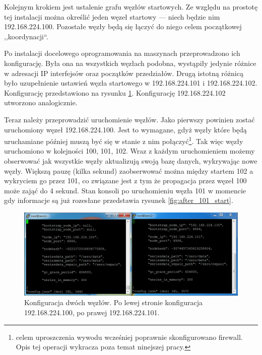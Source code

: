 \documentclass[a4paper,polish,12pt,twoside]{article}
\begin{document}
Kolejnym krokiem jest ustalenie grafu węzłów startowych. Ze względu na prostotę tej instalacji można określić jeden węzeł startowy --- niech będzie nim 192.168.224.100. Pozostałe węzły będą się łączyć do niego celem początkowej ,,koordynacji``.

Po instalacji docelowego oprogramowania na maszynach przeprowadzono ich konfigurację. Była ona na wszystkich węzłach podobna, wystąpiły jedynie różnice w adresacji IP interfejsów oraz początków przedziałów. Drugą istotną różnicą było uzupełnienie ustawień węzła startowego w 192.168.224.101 i 192.168.224.102. Konfigurację przedstawiono na rysunku \ref{fig:example_config}. Konfigurację 192.168.224.102 utworzono analogicznie.

Teraz należy przeprowadzić uruchomienie węzłów. Jako pierwszy powinien zostać uruchomiony węzeł 192.168.224.100. Jest to wymagane, gdyż węzły które będą uruchamiane później muszą być się w stanie z nim połączyć\footnote{celem uproszczenia wywodu wcześniej poprawnie skonfigurowano firewall. Opis tej operacji wykracza poza temat ninejszej pracy.}. Tak więc węzły uruchomiono w kolejności 100, 101, 102. Wraz z każdym uruchomieniem możemy obserwować jak wszystkie węzły aktualizują swoją bazę danych, wykrywając nowe węzły. Większą pauzę (kilka sekund) zaobserwować można między startem 102 a wykryciem go przez 101, co związane jest z tym że propagacja przez węzeł 100 może zająć do 4 sekund. Stan konsoli po uruchomieniu węzła 101 w momencie gdy informacje są już rozesłane przedstawia rysunek \ref{fig:after_101_start}.

	\begin{figure}[h]
		\centering \includegraphics[width=15cm]{example_config}
		\caption[Przykład konfiguracji dwóch węzłów]{Konfiguracja dwóch węzłów. Po lewej stronie konfiguracja 192.168.224.100, po prawej 192.168.224.101.}
		\label{fig:example_config}
	\end{figure}
\end{document}
